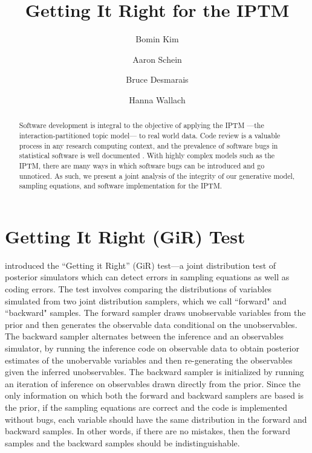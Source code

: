 \documentclass[a4paper]{article}
\title{Getting It Right for the IPTM}
\author[1]{Bomin Kim}
\author[3]{Aaron Schein}
\author[1]{Bruce Desmarais}
\author[2,3]{Hanna Wallach}
\affil[1]{Pennsylvania State University}
\affil[2]{Microsoft Research NYC}
\affil[3]{University of Massachusetts Amherst}
\begin{document}
\setlength{\parindent}{0pt}
\maketitle
\begin{abstract}
	
	\noindent Software development is integral to the objective of applying the IPTM ---the interaction-partitioned topic model--- to real world data. Code review is a valuable process in any research computing context, and the prevalence of software bugs in statistical software is well documented \citep[e.g., ][]{altman2004numerical,mccullough2009accuracy}.  With highly complex models such as the IPTM, there are many ways in which software bugs can be introduced and go unnoticed. As such, we present a joint analysis of the integrity of our generative model, sampling equations, and software implementation for the IPTM.  
\end{abstract}
  \section{Getting It Right (GiR) Test}
 \cite{geweke2004getting} introduced the ``Getting it Right'' (GiR) test---a joint distribution test of posterior simulators which can detect errors in sampling equations as well as coding errors.  The test involves comparing the distributions of variables simulated from two joint distribution samplers, which we call ``forward" and ``backward" samples. The forward sampler draws unobservable variables from the prior and then generates the observable data conditional on the unobservables. The backward sampler alternates between the inference and an observables simulator, by running the inference code on observable data to obtain posterior estimates of the unobervable variables and then re-generating the observables given the inferred unobservables. The backward sampler is initialized by running an iteration of inference on observables drawn directly from the prior. Since the only information on which both the forward and backward samplers are based is the prior, if the sampling equations are correct and the code is implemented without bugs, each variable should have the same distribution in the forward and backward samples. In other words, if there are no mistakes, then the
 forward samples and the backward samples should be indistinguishable.
\end{document}
